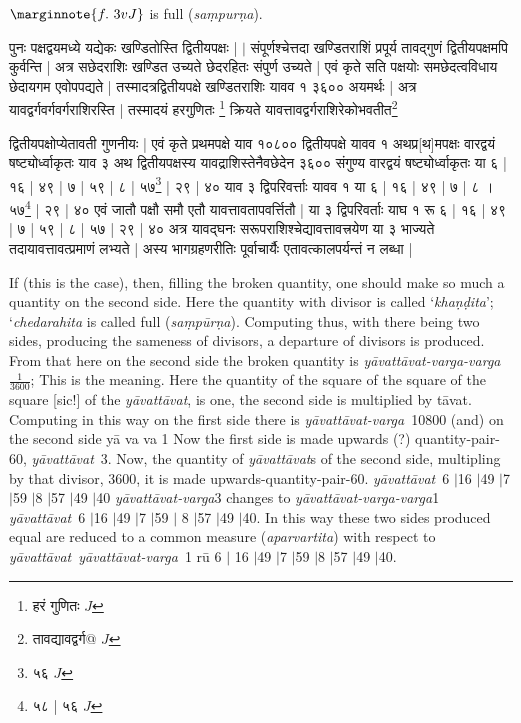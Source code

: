 \documentclass[12pt]{book}
\def\ya{\textit{y\=avat\-t\=avat}}
\def\yava{\textit{y\=avat\-t\=avat-varga}}
\def\yavava{\textit{y\=avat\-t\=avat-varga-varga}}
\def\danda{$|$}
\begin{document}
$\marginnote{f.~3v J}$
is full (\textit{sa\d mpur\d na}).  

\newpage

{\s पुनः पक्षद्वयमध्ये यद्येकः खण्डितोस्ति द्वितीयपक्षः | $|$
संपूर्णश्चेत्तदा खण्डितराशिं प्रपूर्य तावद्गुणं द्वितीयपक्षमपि कुर्वन्ति | अत्र सछेदराशिः खण्डित
उच्यते छेदरहितः संपुर्ण उच्यते | एवं कृते सति पक्षयोः समछेदत्वविधाय छेदायगम
एवोपपद्यते | तस्मादत्रद्वितीयपक्षे खण्डितराशिः यावव १ ३६०० अयमर्थः | अत्र
यावद्वर्गवर्गवर्गराशिरस्ति | तस्मादयं हरगुणितः \footnote{{\s हरं गुणितः} $J$} क्रियते यावत्तावद्वर्गराशिरेकोभवतीत\footnote{{\s तावद्यावद्वर्ग@} $J$} 

द्वितीयपक्षोप्येतावती गुणनीयः | एवं कृते प्रथमपक्षे याव १०८०० द्वितीयपक्षे यावव १ अथप्र[थ]मपक्षः
वारद्वयं षष्ट्योर्ध्वाकृतः याव ३ अथ द्वितीयपक्षस्य यावद्राशिस्तेनैवछेदेन ३६०० संगुण्य
वारद्वयं षष्ट्योर्ध्वाकृतः या ६ | १६ | ४९ | ७ | ५९ | ८ | ५७\footnote{{\s ५६} $J$} | २९ | ४० याव ३ द्विपरिवर्त्ताः यावव १ या ६ | १६ | ४९ | ७ |
८ । ५७\footnote{{\s ५८ | ५६} $J$} | २९ | ४० एवं जातौ पक्षौ समौ एतौ यावत्तावतापवर्त्तितौ | या ३ द्विपरिवर्ताः याघ १ रू ६ | १६ | ४९ | ७ |
५९ | ८ | ५७ | २९ | ४० अत्र यावद्घनः सरूपराशिश्चेद्यावत्तावत्त्रयेण या ३ भाज्यते तदायावत्तावत्प्रमाणं
लभ्यते | अस्य भागग्रहणरीतिः पूर्वाचार्यैः एतावत्कालपर्यन्तं न लब्धा |}

\newpage

If (this is the case), then, filling the broken quantity, one should make so much a quantity 
on the second side.  Here the quantity with divisor is called `\textit{kha\d n\d dita}'; 
`\textit{chedarahita} is called full (\textit{sa\d mp\=ur\d na}).  Computing thus, with there 
being two sides,  producing the sameness of divisors, a departure of divisors is produced.  
From that here on the second side the broken quantity is \yavava\  $\frac{1}{3600}$; 
This is the meaning.  Here the quantity of the square of the square of the square [sic!] 
of the \ya, is one, the second side is multiplied by t\=avat.  Computing in this way on 
the first side there is \yava\ 10800 (and) on the second side y\=a va va 1 Now the 
first side is made upwards (?) quantity-pair-60, \ya\ 3.  Now, the quantity of \ya s 
of the second side, multipling by that divisor, 3600, it is made upwards-quantity-pair-60. 
\ya\ 6 \danda 16 \danda 49 \danda 7 \danda 59 \danda 8 \danda 57 \danda 49 \danda 40 
\yava 3 changes to \yavava 1 \ya\ 6 \danda 16 \danda 49 \danda 7 \danda 59 \danda 
8 \danda 57 \danda 49 \danda 40.  In this way these two sides  produced equal are reduced 
to a common measure (\textit{aparvartita}) with respect to \ya\ \yava\ 1 r\=u 6 \danda 
16 \danda 49 \danda 7 \danda 59 \danda 8 \danda 57 \danda 49 \danda 40.
\end{document}

